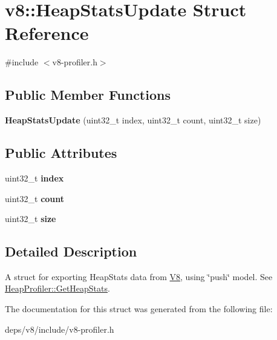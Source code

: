 \hypertarget{structv8_1_1_heap_stats_update}{}\section{v8\+:\+:Heap\+Stats\+Update Struct Reference}
\label{structv8_1_1_heap_stats_update}


{\ttfamily \#include $<$v8-\/profiler.\+h$>$}

\subsection*{Public Member Functions}
\begin{DoxyCompactItemize}
\item 
\hypertarget{structv8_1_1_heap_stats_update_aba606181fa7071647cc91a558c450cf3}{}{\bfseries Heap\+Stats\+Update} (uint32\+\_\+t index, uint32\+\_\+t count, uint32\+\_\+t size)\label{structv8_1_1_heap_stats_update_aba606181fa7071647cc91a558c450cf3}

\end{DoxyCompactItemize}
\subsection*{Public Attributes}
\begin{DoxyCompactItemize}
\item 
\hypertarget{structv8_1_1_heap_stats_update_a90f427acc6e9b8cf2001ca09541545d7}{}uint32\+\_\+t {\bfseries index}\label{structv8_1_1_heap_stats_update_a90f427acc6e9b8cf2001ca09541545d7}

\item 
\hypertarget{structv8_1_1_heap_stats_update_aa74badb1bd196e538b45b971350c33de}{}uint32\+\_\+t {\bfseries count}\label{structv8_1_1_heap_stats_update_aa74badb1bd196e538b45b971350c33de}

\item 
\hypertarget{structv8_1_1_heap_stats_update_a842a199bd372f411f0ae5816e38c45e2}{}uint32\+\_\+t {\bfseries size}\label{structv8_1_1_heap_stats_update_a842a199bd372f411f0ae5816e38c45e2}

\end{DoxyCompactItemize}


\subsection{Detailed Description}
A struct for exporting Heap\+Stats data from \hyperlink{classv8_1_1_v8}{V8}, using \char`\"{}push\char`\"{} model. See \hyperlink{classv8_1_1_heap_profiler_a756d71126e0effc7543fb33e856dd738}{Heap\+Profiler\+::\+Get\+Heap\+Stats}. 

The documentation for this struct was generated from the following file\+:\begin{DoxyCompactItemize}
\item 
deps/v8/include/v8-\/profiler.\+h\end{DoxyCompactItemize}
